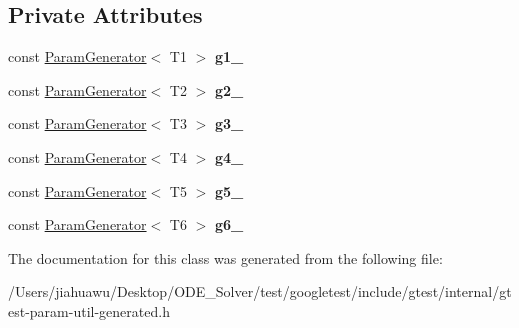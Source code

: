 \subsection*{Private Attributes}
\begin{DoxyCompactItemize}
\item 
\mbox{\label{classtesting_1_1internal_1_1_cartesian_product_generator6_a81f61293deb35e167a71f59c299a3da8}} 
const \mbox{\hyperlink{classtesting_1_1internal_1_1_param_generator}{Param\+Generator}}$<$ T1 $>$ {\bfseries g1\+\_\+}
\item 
\mbox{\label{classtesting_1_1internal_1_1_cartesian_product_generator6_a350b03e86d0113d81d918e1e3697bdb8}} 
const \mbox{\hyperlink{classtesting_1_1internal_1_1_param_generator}{Param\+Generator}}$<$ T2 $>$ {\bfseries g2\+\_\+}
\item 
\mbox{\label{classtesting_1_1internal_1_1_cartesian_product_generator6_a9c02c7049073a52c5fe3255546c4739a}} 
const \mbox{\hyperlink{classtesting_1_1internal_1_1_param_generator}{Param\+Generator}}$<$ T3 $>$ {\bfseries g3\+\_\+}
\item 
\mbox{\label{classtesting_1_1internal_1_1_cartesian_product_generator6_a7f01e0dbe74f79a9abe94a64e967e95d}} 
const \mbox{\hyperlink{classtesting_1_1internal_1_1_param_generator}{Param\+Generator}}$<$ T4 $>$ {\bfseries g4\+\_\+}
\item 
\mbox{\label{classtesting_1_1internal_1_1_cartesian_product_generator6_aa84915ffc8834fb18901f221405a202e}} 
const \mbox{\hyperlink{classtesting_1_1internal_1_1_param_generator}{Param\+Generator}}$<$ T5 $>$ {\bfseries g5\+\_\+}
\item 
\mbox{\label{classtesting_1_1internal_1_1_cartesian_product_generator6_a40767d9c00e76779bb2b42840a1219ab}} 
const \mbox{\hyperlink{classtesting_1_1internal_1_1_param_generator}{Param\+Generator}}$<$ T6 $>$ {\bfseries g6\+\_\+}
\end{DoxyCompactItemize}


The documentation for this class was generated from the following file\+:\begin{DoxyCompactItemize}
\item 
/\+Users/jiahuawu/\+Desktop/\+O\+D\+E\+\_\+\+Solver/test/googletest/include/gtest/internal/gtest-\/param-\/util-\/generated.\+h\end{DoxyCompactItemize}
